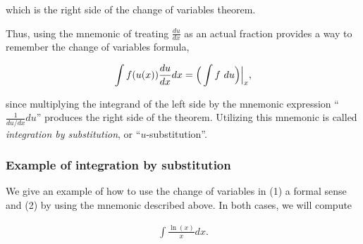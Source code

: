 \documentclass{article}
\begin{document}
which is the right side of the change of variables theorem.

Thus, using the mnemonic of treating $\frac{du}{dx}$ as an actual fraction provides a way to remember the change of variables formula, 

\begin{align*}
    \int f(u(x)) \frac{du}{dx} dx = \Big( \int f \text{ } du \Big)\Big|_x,
\end{align*}

since multiplying the integrand of the left side by the mnemonic expression ``$\frac{1}{du/dx} du$'' produces the right side of the theorem. Utilizing this mnemonic is called \textit{integration by substitution}, or ``$u$-substitution''.

\subsubsection*{Example of integration by substitution}

We give an example of how to use the change of variables in (1) a formal sense and (2) by using the mnemonic described above. In both cases, we will compute

\begin{align*}
    \int \frac{\ln(x)}{x} dx.
\end{align*}
\end{document}
